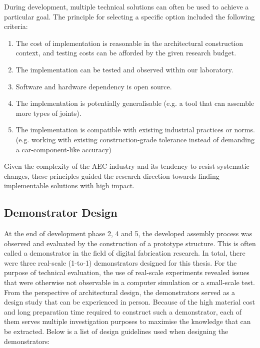 During development, multiple technical solutions can often be used to achieve a particular goal. The principle for selecting a specific option included the following criteria: 

\begin{enumerate}[nosep]
	\item The cost of implementation is reasonable in the architectural construction context, and testing costs can be afforded by the given research budget.
	\item The implementation can be tested and observed within our laboratory.
	\item Software and hardware dependency is open source.
	\item The implementation is potentially generalisable (e.g. a tool that can assemble more types of joints).
	\item The implementation is compatible with existing industrial practices or norms. (e.g. working with existing construction-grade tolerance instead of demanding a car-component-like accuracy) 
\end{enumerate}

Given the complexity of the AEC industry and its tendency to resist systematic changes, these principles guided the research direction towards finding implementable solutions with high impact.

\subsection{Demonstrator Design}
\label{subsection:methodology-demonstraror-design}

At the end of development phase 2, 4 and 5, the developed assembly process was observed and evaluated by the construction of a prototype structure. This is often called a demonstrator in the field of digital fabrication research. In total, there were three real-scale (1-to-1) demonstrators designed for this thesis. For the purpose of technical evaluation, the use of real-scale experiments revealed issues that were otherwise not observable in a computer simulation or a small-scale test. From the perspective of architectural design, the demonstrators served as a design study that can be experienced in person. Because of the high material cost and long preparation time required to construct such a demonstrator, each of them serves multiple investigation purposes to maximise the knowledge that can be extracted. Below is a list of design guidelines used when designing the demonstrators:

